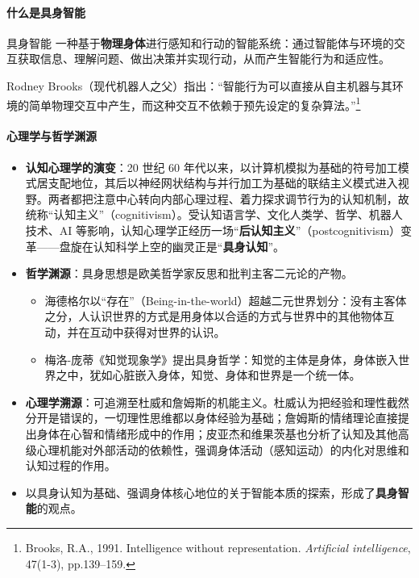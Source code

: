 \paragraph{什么是具身智能}

\begin{fancybox}[grassgreen]{具身智能}
一种基于\textbf{物理身体}进行感知和行动的智能系统：通过智能体与环境的交互获取信息、理解问题、做出决策并实现行动，从而产生智能行为和适应性。
\end{fancybox}

Rodney Brooks（现代机器人之父）指出：“智能行为可以直接从自主机器与其环境的简单物理交互中产生，而这种交互不依赖于预先设定的复杂算法。”\footnote{Brooks, R.A., 1991. Intelligence without representation. \textit{Artificial intelligence}, 47(1-3), pp.139--159.}

\paragraph{心理学与哲学渊源}

\begin{itemize}[itemsep=2pt]
    \item \textbf{认知心理学的演变}：20 世纪 60 年代以来，以计算机模拟为基础的符号加工模式居支配地位，其后以神经网状结构与并行加工为基础的联结主义模式进入视野。两者都把注意中心转向内部心理过程、着力探求调节行为的认知机制，故统称“认知主义”（cognitivism）。受认知语言学、文化人类学、哲学、机器人技术、AI 等影响，认知心理学正经历一场“\textbf{后认知主义}”（postcognitivism）变革——盘旋在认知科学上空的幽灵正是“\textbf{具身认知}”。
    \item \textbf{哲学渊源}：具身思想是欧美哲学家反思和批判主客二元论的产物。
    \begin{itemize}
        \item 海德格尔以“存在”（Being-in-the-world）超越二元世界划分：没有主客体之分，人认识世界的方式是用身体以合适的方式与世界中的其他物体互动，并在互动中获得对世界的认识。
        \item 梅洛-庞蒂《知觉现象学》提出具身哲学：知觉的主体是身体，身体嵌入世界之中，犹如心脏嵌入身体，知觉、身体和世界是一个统一体。
    \end{itemize}
    \item \textbf{心理学溯源}：可追溯至杜威和詹姆斯的机能主义。杜威认为把经验和理性截然分开是错误的，一切理性思维都以身体经验为基础；詹姆斯的情绪理论直接提出身体在心智和情绪形成中的作用；皮亚杰和维果茨基也分析了认知及其他高级心理机能对外部活动的依赖性，强调身体活动（感知运动）的内化对思维和认知过程的作用。
    \item 以具身认知为基础、强调身体核心地位的关于智能本质的探索，形成了\textbf{具身智能}的观点。
\end{itemize}

